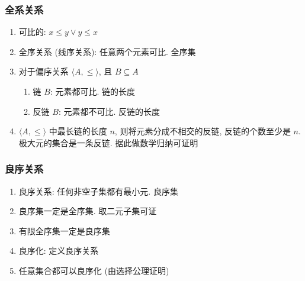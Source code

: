 \documentclass[11pt,a4paper,twocolumn,fleqn]{article} %
\begin{document}
\subsubsection{全系关系} %
\label{ssub:full_ordering}
\begin{enumerate}
	\item 可比的: $x\le y \lor y\le x$
	\item 全序关系 (线序关系): 任意两个元素可比. 全序集
	\item  对于偏序关系 $\langle A, \le \rangle$, 且 $B\subseteq A$
	\begin{enumerate}
		\item 链 $B$: 元素都可比. 链的长度
		\item 反链 $B$: 元素都不可比. 反链的长度
	\end{enumerate}
	\item $\langle A, \le \rangle$ 中最长链的长度 $n$, 则将元素分成不相交的反链, 
	反链的个数至少是 $n$. \\
	极大元的集合是一条反链. 据此做数学归纳可证明
\end{enumerate}
\subsubsection{良序关系} %
\label{ssub:well_ordering}
\begin{enumerate}
	\item 良序关系: 任何非空子集都有最小元. 良序集
	\item 良序集一定是全序集. 取二元子集可证
	\item 有限全序集一定是良序集
	\item 良序化: 定义良序关系
	\item 任意集合都可以良序化 (由选择公理证明)
\end{enumerate}
\end{document}
